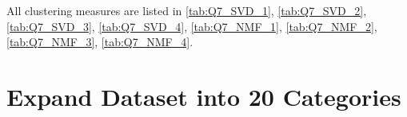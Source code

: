 \documentclass[runningheads]{llncs}
\begin{document}
\begin{table}[h]
\center
\caption{Performance for NMF after normalization (non-linear transformation) (r=2)}
\label{tab:Q7_NMF_2}
\end{table}

\begin{table}[h]
\center
\caption{Performance for NMF after normalization (scaling + non-linear transformation) (r=2)}
\label{tab:Q7_NMF_3}
\end{table}

\begin{table}[h]
\center
\caption{Performance for NMF after normalization (non-linear transformation + scaling) (r=2)}
\label{tab:Q7_NMF_4}
\end{table}

All clustering measures are listed in \ref{tab:Q7_SVD_1}, \ref{tab:Q7_SVD_2}, \ref{tab:Q7_SVD_3}, \ref{tab:Q7_SVD_4}, \ref{tab:Q7_NMF_1}, \ref{tab:Q7_NMF_2}, \ref{tab:Q7_NMF_3}, \ref{tab:Q7_NMF_4}.

\section{Expand Dataset into 20 Categories}
\end{document}

